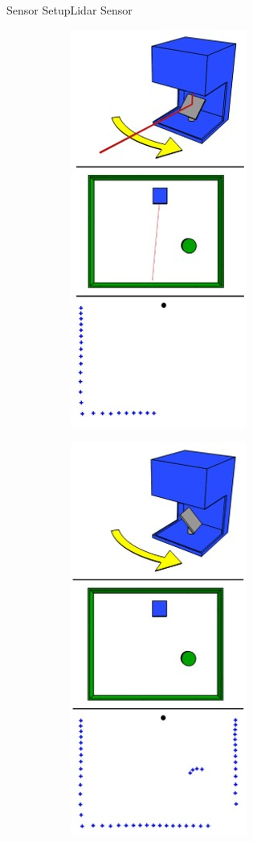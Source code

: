 \documentclass[169, handout	]{THIbeamer} %
\begin{document}
\begin{frame}{Sensor Setup}{Lidar Sensor}
\begin{figure}[htbp]
\begin{subfigure}[b]{0.15\textwidth}
       		 	\includegraphics[scale=0.2]{required/LiDAR-Sensor2.jpg}
        		\label{Lidar-t2}
    		\end{subfigure}
   	 		\begin{subfigure}[b]{0.15\textwidth}
        		\includegraphics[scale=0.2]{required/LiDAR-Sensor3.jpg}
        		\label{Lidar-t3}
    		\end{subfigure}
    		\label{Lidar in Raum}
		\end{figure}
	\end{frame}
	
\end{document}
